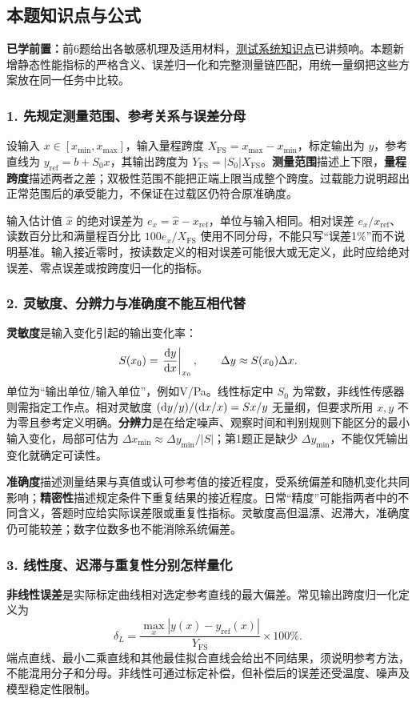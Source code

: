 \subsection*{本题知识点与公式}\label{kn:4-7}
\noindent\textbf{已学前置：}前6题给出各敏感机理及适用材料，\hyperref[kn:3-1]{测试系统知识点}已讲频响。本题新增静态性能指标的严格含义、误差归一化和完整测量链匹配，用统一量纲把这些方案放在同一任务中比较。

\subsubsection*{1. 先规定测量范围、参考关系与误差分母}
设输入 $x\in[x_{\min},x_{\max}]$，输入量程跨度 $X_{\mathrm{FS}}=x_{\max}-x_{\min}$，标定输出为 $y$，参考直线为 $y_{\mathrm{ref}}=b+S_0x$，其输出跨度为 $Y_{\mathrm{FS}}=|S_0|X_{\mathrm{FS}}$。\textbf{测量范围}描述上下限，\textbf{量程跨度}描述两者之差；双极性范围不能把正端上限当成整个跨度。过载能力说明超出正常范围后的承受能力，不保证在过载区仍符合原准确度。

输入估计值 $\hat x$ 的绝对误差为 $e_x=\hat x-x_{\mathrm{ref}}$，单位与输入相同。相对误差 $e_x/x_{\mathrm{ref}}$、读数百分比和满量程百分比 $100e_x/X_{\mathrm{FS}}$ 使用不同分母，不能只写“误差1\%”而不说明基准。输入接近零时，按读数定义的相对误差可能很大或无定义，此时应给绝对误差、零点误差或按跨度归一化的指标。

\subsubsection*{2. 灵敏度、分辨力与准确度不能互相代替}
\textbf{灵敏度}是输入变化引起的输出变化率：
\[
S(x_0)=\left.\frac{\mathrm{d} y}{\mathrm{d} x}\right|_{x_0},\qquad
\Delta y\approx S(x_0)\Delta x.
\]
单位为“输出单位/输入单位”，例如V/Pa。线性标定中 $S_0$ 为常数，非线性传感器则需指定工作点。相对灵敏度 $(\mathrm{d} y/y)/(\mathrm{d} x/x)=Sx/y$ 无量纲，但要求所用 $x,y$ 不为零且参考定义明确。\textbf{分辨力}是在给定噪声、观察时间和判别规则下能区分的最小输入变化，局部可估为 $\Delta x_{\min}\approx\Delta y_{\min}/|S|$；第1题正是缺少 $\Delta y_{\min}$，不能仅凭输出变化就确定可读性。

\textbf{准确度}描述测量结果与真值或认可参考值的接近程度，受系统偏差和随机变化共同影响；\textbf{精密性}描述规定条件下重复结果的接近程度。日常“精度”可能指两者中的不同含义，答题时应给实际误差限或重复性指标。灵敏度高但温漂、迟滞大，准确度仍可能较差；数字位数多也不能消除系统偏差。

\subsubsection*{3. 线性度、迟滞与重复性分别怎样量化}
\textbf{非线性误差}是实际标定曲线相对选定参考直线的最大偏差。常见输出跨度归一化定义为
\[
\delta_L=\frac{\max_x|y(x)-y_{\mathrm{ref}}(x)|}{Y_{\mathrm{FS}}}\times100\%.
\]
端点直线、最小二乘直线和其他最佳拟合直线会给出不同结果，须说明参考方法，不能混用分子和分母。非线性可通过标定补偿，但补偿后的误差还受温度、噪声及模型稳定性限制。

